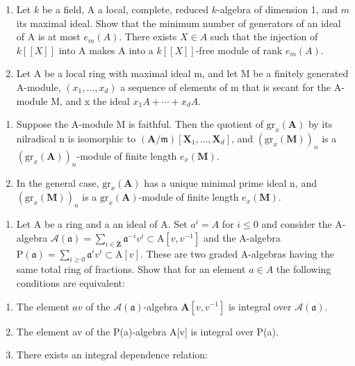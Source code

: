 \begin{enumerate}
\def\labelenumi{\arabic{enumi})}
\setcounter{enumi}{5}
\item
  Let \(k\) be a field, A a local, complete, reduced \(k\)-algebra of dimension 1, and \(m\) its maximal ideal. Show that the minimum number of generators of an ideal of A is at most \(e_m(A)\). There exists \(X \in A\) such that the injection of \(k[[X]]\) into A makes A into a \(k[[X]]\)-free module of rank \(e_m(A)\).
\item
  Let A be a local ring with maximal ideal m, and let M be a finitely generated A-module, \((x_{1}, \ldots, x_{d})\) a sequence of elements of m that is secant for the A-module M, and x the ideal \(x_{1}A + \cdots + x_{d}A\).
\end{enumerate}

\begin{enumerate}
\def\labelenumi{\alph{enumi})}
\tightlist
\item
  Suppose the A-module M is faithful. Then the quotient of \(\mathrm{gr}_{x}(\mathbf{A})\) by its nilradical n is isomorphic to \((\mathbf{A}/\mathfrak{m})[\mathbf{X}_{1}, \ldots, \mathbf{X}_{d}]\), and \((\mathrm{gr}_{x}(\mathbf{M}))_{n}\) is a \((\mathrm{gr}_{x}(\mathbf{A}))_{n}\)-module of finite length \(e_{x}(\mathbf{M})\).
\item
  In the general case, \(\mathrm{gr}_{x}(\mathbf{A})\) has a unique minimal prime ideal n, and \((\mathrm{gr}_{x}(\mathbf{M}))_{n}\) is a \(\mathrm{gr}_{x}(\mathbf{A})\)-module of finite length \(e_{x}(\mathbf{M})\).
\end{enumerate}

\begin{enumerate}
\def\labelenumi{\arabic{enumi})}
\setcounter{enumi}{7}
\tightlist
\item
  Let A be a ring and a an ideal of A. Set \(a^{i} = A\) for \(i \leqslant 0\) and consider the A-algebra \(\mathcal{A}(\mathfrak{a}) = \sum_{i \in \mathbf{Z}} \mathfrak{a}^{-i} v^{i} \subset \mathrm{A}[v, v^{-1}]\) and the A-algebra \(\mathrm{P}(\mathfrak{a}) = \sum_{i \geqslant 0} \mathfrak{a}^{i} v^{i} \subset \mathrm{A}[v]\). These are two graded A-algebras having the same total ring of fractions. Show that for an element \(a \in A\) the following conditions are equivalent:
\end{enumerate}

\begin{enumerate}
\def\labelenumi{(\roman{enumi})}
\item
  The element \(av\) of the \(\mathcal{A}(\mathfrak{a})\)-algebra \(\mathbf{A}[v, v^{-1}]\) is integral over \(\mathcal{A}(\mathfrak{a})\).
\item
  The element av of the P(a)-algebra A{[}v{]} is integral over P(a).
\item
  There exists an integral dependence relation:
\end{enumerate}

